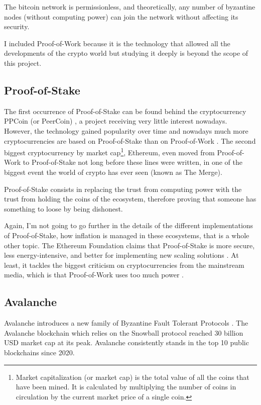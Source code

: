 \documentclass[11pt, twocolumn]{article}
\begin{document}
The bitcoin network is permissionless, and theoretically, any number of byzantine nodes (without computing power) can join the network without affecting its security.

I included Proof-of-Work because it is the technology that allowed all the developments of the crypto world but studying it deeply is beyond the scope of this project.



\subsection{Proof-of-Stake}
The first occurrence of Proof-of-Stake can be found behind the cryptocurrency PPCoin (or PeerCoin) \cite{ppcoin}, a project receiving very little interest nowadays. However, the technology gained popularity over time and nowadays much more cryptocurrencies are based on Proof-of-Stake than on Proof-of-Work \cite{coinmarketcap}. 
The second biggest cryptocurrency by market cap\footnote{Market capitalization (or market cap) is the total value of all the coins that have been mined. It is calculated by multiplying the number of coins in circulation by the current market price of a single coin.}, Ethereum, even moved from Proof-of-Work to Proof-of-Stake not long before these lines were written, in one of the biggest event the world of crypto has ever seen (known as The Merge).

Proof-of-Stake consists in replacing the trust from computing power with the trust from holding the coins of the ecosystem, therefore proving that someone has something to loose by being dishonest.

Again, I'm not going to go further in the details of the different implementations of Proof-of-Stake, how inflation is managed in these ecosystems, that is a whole other topic. The Ethereum Foundation claims that Proof-of-Stake is more secure, less energy-intensive, and better for implementing new scaling solutions \cite{ethereum}. 
At least, it tackles the biggest criticism on cryptocurrencies from the mainstream media, which is that Proof-of-Work uses too much power \cite{bitcoinUse}.


\subsection{Avalanche}

Avalanche introduces a new family of Byzantine Fault Tolerant Protocols \cite{snowprotocol}. The Avalanche blockchain which relies on the Snowball protocol reached 30 billion USD market cap at its peak. Avalanche consistently stands in the top 10 public blockchains since 2020.
\end{document}
